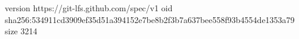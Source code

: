 version https://git-lfs.github.com/spec/v1
oid sha256:534911cd3909ef35d51a394152e7be8b2f3b7a637bee558f93b4554de1353a79
size 3214
